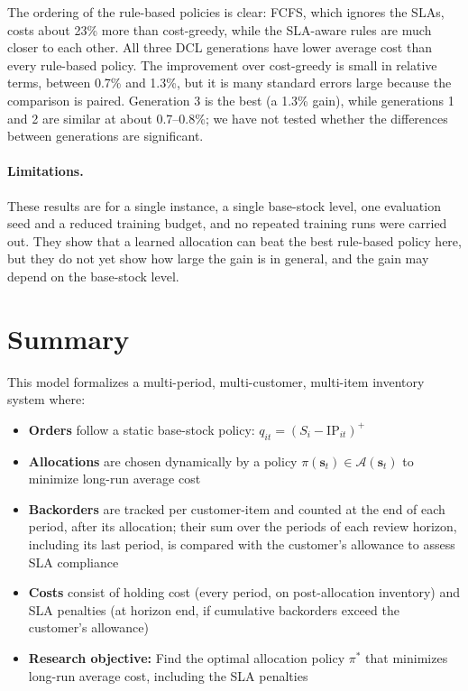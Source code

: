 \documentclass[11pt, a4paper]{article}
\theoremstyle{definition}
\theoremstyle{remark}
\newcommand{\IP}{\text{IP}}
\begin{document}
The ordering of the rule-based policies is clear: FCFS, which ignores the SLAs, costs about 23\% more than cost-greedy, while the SLA-aware rules are much closer to each other. All three DCL generations have lower average cost than every rule-based policy. The improvement over cost-greedy is small in relative terms, between 0.7\% and 1.3\%, but it is many standard errors large because the comparison is paired. Generation 3 is the best (a 1.3\% gain), while generations 1 and 2 are similar at about 0.7--0.8\%; we have not tested whether the differences between generations are significant.

\paragraph{Limitations.} These results are for a single instance, a single base-stock level, one evaluation seed and a reduced training budget, and no repeated training runs were carried out. They show that a learned allocation can beat the best rule-based policy here, but they do not yet show how large the gain is in general, and the gain may depend on the base-stock level.

\section{Summary}

This model formalizes a multi-period, multi-customer, multi-item inventory system where:

\begin{itemize}
    \item \textbf{Orders} follow a static base-stock policy: $q_{it} = (S_i - \IP_{it})^+$

    \item \textbf{Allocations} are chosen dynamically by a policy $\pi(\mathbf{s}_t) \in \mathcal{A}(\mathbf{s}_t)$ to minimize long-run average cost

    \item \textbf{Backorders} are tracked per customer-item and counted at the end of each period, after its allocation; their sum over the periods of each review horizon, including its last period, is compared with the customer's allowance to assess SLA compliance

    \item \textbf{Costs} consist of holding cost (every period, on post-allocation inventory) and SLA penalties (at horizon end, if cumulative backorders exceed the customer's allowance)

    \item \textbf{Research objective:} Find the optimal allocation policy $\pi^*$ that minimizes long-run average cost, including the SLA penalties
\end{itemize}
\end{document}
